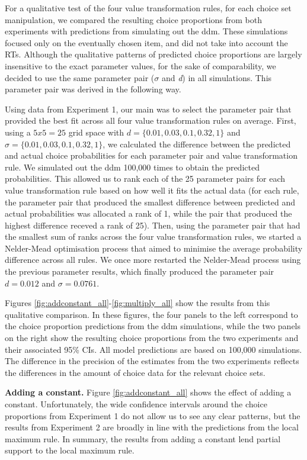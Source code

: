 \documentclass[11pt,a4paper]{article}
\begin{document}
For a qualitative test of the four value transformation rules, for each choice set manipulation, we compared the resulting choice proportions from both experiments with predictions from simulating out the ddm. These simulations focused only on the eventually chosen item, and did not take into account the RTs. Although the qualitative patterns of predicted choice proportions are largely insensitive to the exact parameter values, for the sake of comparability, we decided to use the same parameter pair ($\sigma$ and \textit{d}) in all simulations. This parameter pair was derived in the following way.

Using data from Experiment 1, our main was to select the parameter pair that provided the best fit across all four value transformation rules on average. First, using a $5x5=25$ grid space with $d=\{0.01, 0.03, 0.1, 0.32, 1\}$ and $\sigma=\{0.01, 0.03, 0.1, 0.32, 1\}$,  we calculated the difference between the predicted and actual choice probabilities for each parameter pair and value transformation rule. We simulated out the ddm 100,000 times to obtain the predicted probabilities. This allowed us to rank each of the 25 parameter pairs for each value transformation rule based on how well it fits the actual data (for each rule, the parameter pair that produced the smallest difference between predicted and actual probabilities was allocated a rank of 1, while the pair that produced the highest difference receved a rank of 25). Then, using the parameter pair that had the smallest sum of ranks across the four value transformation rules, we started a Nelder-Mead optimisation process that aimed to minimise the average probability difference across all rules. We once more restarted the Nelder-Mead process using the previous parameter results, which finally produced the parameter pair $d=0.012$ and $\sigma=0.0761$.

Figures \ref{fig:addconstant_all}-\ref{fig:multiply_all} show the results from this qualitative comparison. In these figures, the four panels to the left correspond to the choice proportion predictions from the ddm simulations, while the two panels on the right show the resulting choice proportions from the two experiments and their associated 95\% CIs. All model predictions are based on 100,000 simulations. The difference in the precision of the estimates from the two experiments reflects the differences in the amount of choice data for the relevant choice sets.  

\textbf{Adding a constant.} Figure \ref{fig:addconstant_all} shows the effect of adding a constant. Unfortunately, the wide confidence intervals around the choice proportions from Experiment 1 do not allow us to see any clear patterns, but the results from Experiment 2 are broadly in line with the predictions from the local maximum rule. In summary, the results from adding a constant lend partial support to the local maximum rule.  
\end{document}
